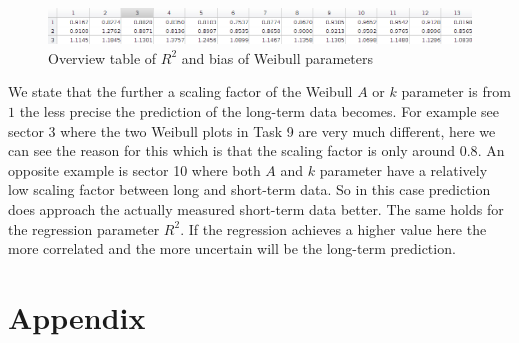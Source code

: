 \documentclass[10pt]{article}
\begin{document}
\begin{figure}[H]
\centering
  \includegraphics[width=1\linewidth]{../figures/overview.jpg}
  \caption{Overview table of $R^2$ and bias of Weibull parameters}
  \label{fig:overview}
\end{figure}

We state that the further a scaling factor of the Weibull $A$ or $k$ parameter is from $1$ the less precise the prediction of the long-term data becomes. For example see sector 3 where the two Weibull plots in Task 9 are very much different, here we can see the reason for this which is that the scaling factor is only around $0.8$. An opposite example is sector 10 where both $A$ and $k$ parameter have a relatively low scaling factor between long and short-term data. So in this case prediction does approach the actually measured short-term data better. The same holds for the regression parameter $R^2$. If the regression achieves a higher value here the more correlated and the more uncertain will be the long-term prediction.

\newpage

\appendix
\section{Appendix}
\end{document}
